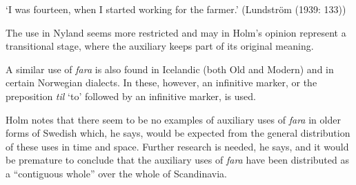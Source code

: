 \begin{styleTranslation}
‘I was fourteen, when I started working for the farmer.’ (Lundström (1939: 133))

\end{styleTranslation}

\begin{styleBodyTextFirst}
The use in Nyland seems more restricted and may in Holm’s opinion represent a transitional stage, where the auxiliary keeps part of its original meaning. 

\end{styleBodyTextFirst}

\begin{styleBodytextC}
A similar use of \textit{fara} is also found in Icelandic (both Old and Modern) and in certain Norwegian dialects. In these, however, an infinitive marker, or the preposition \textit{til} ‘to’ followed by an infinitive marker, is used. 

\end{styleBodytextC}

\begin{styleBodytextC}
Holm notes that there seem to be no examples of auxiliary uses of \textit{fara} in older forms of Swedish which, he says, would be expected from the general distribution of these uses in time and space. Further research is needed, he says, and it would be premature to conclude that the auxiliary uses of \textit{fara} have been distributed as a “contiguous whole” over the whole of Scandinavia.

\end{styleBodytextC}

\begin{styleBodytextC}
  [Warning: Image ignored] %
 

\end{styleBodytextC}

\begin{stylecaption}

\end{stylecaption}

\begin{figure}[h]

\begin{minipage}{6.5311in}

\end{minipage}

\end{figure}

